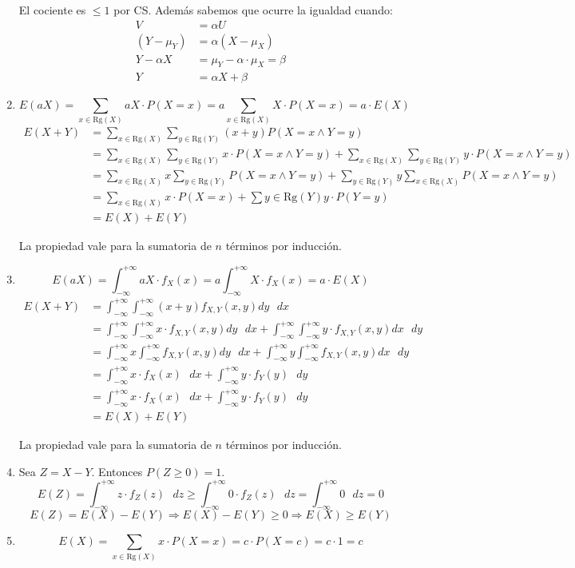\begin{enumerate}
		El cociente es $\leq 1$ por CS. Además sabemos que ocurre la igualdad cuando:
			\begin{align*}
				V			& = \alpha U							\\
				(Y-\mu_Y)	& = \alpha (X-\mu_X)					\\
				Y-\alpha X	& = \mu_Y - \alpha\cdot \mu_X = \beta	\\
				Y			& = \alpha X + \beta
			\end{align*}
			
	\item
		$$E(aX) = \sum_{x\in \text{Rg}(X)} aX\cdot P(X=x) = a\sum_{x\in \text{Rg}(X)} X\cdot P(X=x) = a\cdot E(X)$$
		\begin{align*}
			E(X+Y)	& = \sum_{x\in \text{Rg}(X)}\sum_{y\in \text{Rg}(Y)}(x+y)P(X=x \land Y=y)	\\
					& = \sum_{x\in \text{Rg}(X)}\sum_{y\in \text{Rg}(Y)}x\cdot P(X=x \land Y=y) + \sum_{x\in \text{Rg}(X)}\sum_{y\in \text{Rg}(Y)}y\cdot P(X=x \land Y=y)	\\
					& = \sum_{x\in \text{Rg}(X)}x\sum_{y\in \text{Rg}(Y)} P(X=x \land Y=y) + \sum_{y\in \text{Rg}(Y)}y \sum_{x\in \text{Rg}(X)} P(X=x \land Y=y)	\\
					& = \sum_{x\in \text{Rg}(X)}x\cdot P(X=x) + \sum{y\in \text{Rg}(Y)}y \cdot P(Y=y)	\\
					& = E(X) + E(Y)
		\end{align*}
		
		La propiedad vale para la sumatoria de $n$ términos por inducción.
	\item
		$$E(aX) = \int_{-\infty}^{+\infty} aX\cdot f_X(x) = a\int_{-\infty}^{+\infty} X\cdot f_X(x) = a\cdot E(X)$$
		\begin{align*}
			E(X+Y)	& = \int_{-\infty}^{+\infty}\int_{-\infty}^{+\infty}(x+y)f_{X,Y}(x,y)dy\text{ }dx	\\
					& = \int_{-\infty}^{+\infty}\int_{-\infty}^{+\infty}x\cdot f_{X,Y}(x,y)dy\text{ }dx + \int_{-\infty}^{+\infty}\int_{-\infty}^{+\infty}y\cdot f_{X,Y}(x,y)dx\text{ }dy	\\
					& = \int_{-\infty}^{+\infty}x\int_{-\infty}^{+\infty} f_{X,Y}(x,y)dy\text{ }dx + \int_{-\infty}^{+\infty}y\int_{-\infty}^{+\infty} f_{X,Y}(x,y)dx\text{ }dy				\\
					& = \int_{-\infty}^{+\infty}x\cdot f_X(x)\text{ }dx + \int_{-\infty}^{+\infty}y\cdot f_Y(y)\text{ }dy	\\
					& = \int_{-\infty}^{+\infty}x\cdot f_X(x)\text{ }dx + \int_{-\infty}^{+\infty}y\cdot f_Y(y)\text{ }dy	\\
					& = E(X) + E(Y)
		\end{align*}
		
		La propiedad vale para la sumatoria de $n$ términos por inducción.
	\item
		Sea $Z = X-Y$. Entonces $P(Z \geq 0) = 1$.
		$$E(Z) = \int_{-\infty}^{+\infty}z\cdot f_Z(z)\text{ }dz \geq \int_{-\infty}^{+\infty}0\cdot f_Z(z)\text{ }dz = \int_{-\infty}^{+\infty}0 \text{ }dz = 0$$
		$$E(Z) = E(X)-E(Y) \Rightarrow E(X)-E(Y) \geq 0 \Rightarrow E(X) \geq E(Y)$$
	\item
		$$E(X) = \sum_{x \in \text{Rg}(X)} x\cdot P(X=x) = c\cdot P(X=c) = c\cdot 1 = c$$
\end{enumerate}

